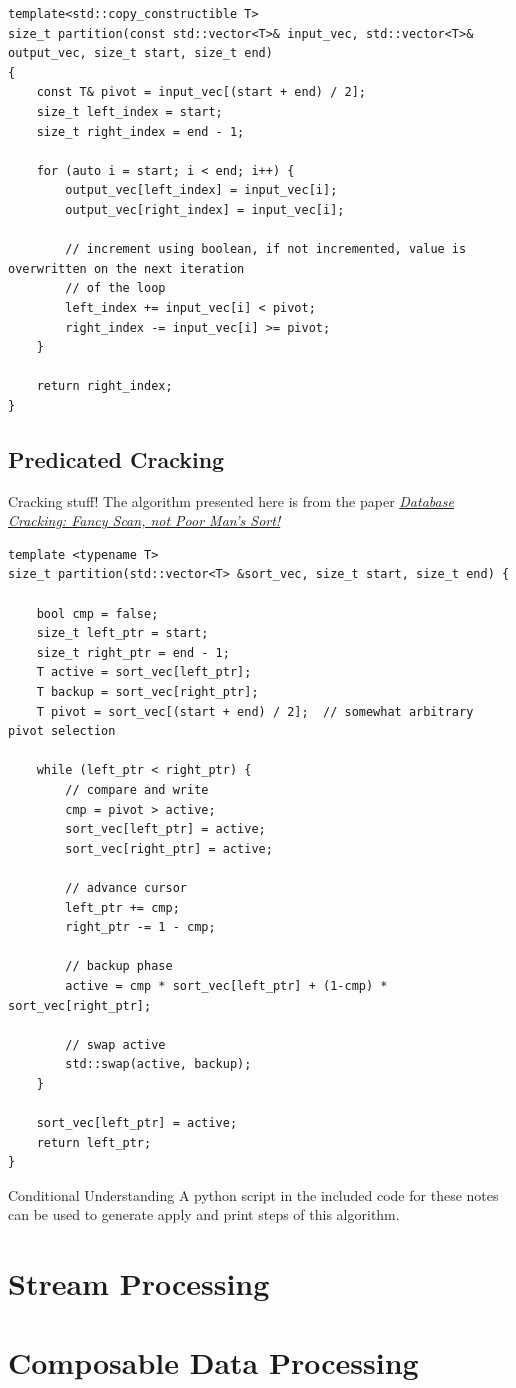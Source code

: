 \begin{verbatim}
template<std::copy_constructible T>
size_t partition(const std::vector<T>& input_vec, std::vector<T>& output_vec, size_t start, size_t end)
{
    const T& pivot = input_vec[(start + end) / 2];  
    size_t left_index = start;
    size_t right_index = end - 1;

    for (auto i = start; i < end; i++) {
        output_vec[left_index] = input_vec[i];
        output_vec[right_index] = input_vec[i];

        // increment using boolean, if not incremented, value is overwritten on the next iteration 
        // of the loop 
        left_index += input_vec[i] < pivot;
        right_index -= input_vec[i] >= pivot;
    }

    return right_index;
}
\end{verbatim}
\subsection{Predicated Cracking}
\begin{sidenotebox}{Cracking stuff!}
    The algorithm presented here is from the paper \href{https://core.ac.uk/download/pdf/301643658.pdf}{\textit{Database Cracking: Fancy Scan, not Poor Man's Sort!}}
\end{sidenotebox}

\begin{verbatim}
template <typename T>
size_t partition(std::vector<T> &sort_vec, size_t start, size_t end) {

    bool cmp = false;
    size_t left_ptr = start;
    size_t right_ptr = end - 1;
    T active = sort_vec[left_ptr];
    T backup = sort_vec[right_ptr];
    T pivot = sort_vec[(start + end) / 2];  // somewhat arbitrary pivot selection

    while (left_ptr < right_ptr) {
        // compare and write
        cmp = pivot > active;
        sort_vec[left_ptr] = active;
        sort_vec[right_ptr] = active;

        // advance cursor
        left_ptr += cmp;
        right_ptr -= 1 - cmp;

        // backup phase
        active = cmp * sort_vec[left_ptr] + (1-cmp) * sort_vec[right_ptr];

        // swap active
        std::swap(active, backup);
    }

    sort_vec[left_ptr] = active;
    return left_ptr;
}
\end{verbatim}

\begin{sidenotebox}{Conditional Understanding}
    A python script in the included code for these notes can be used to generate apply and print steps of this algorithm.
\end{sidenotebox}

\section{Stream Processing}


\section{Composable Data Processing}

